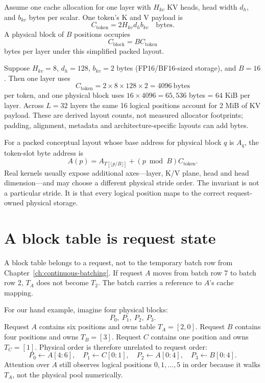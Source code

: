 Assume one cache allocation for one layer with
$H_{kv}$ KV heads, head width $d_h$, and $b_{kv}$ bytes per scalar. One token's
K and V payload is
\begin{equation}
C_{\mathrm{token}}
 = 2H_{kv}d_hb_{kv}\quad\text{bytes}.
\label{eq:paged-token-bytes}
\end{equation}
A physical block of $B$ positions occupies
\begin{equation}
C_{\mathrm{block}}
 = B C_{\mathrm{token}}
\label{eq:paged-block-bytes}
\end{equation}
bytes per layer under this simplified packed layout.

Suppose $H_{kv}=8$, $d_h=128$, $b_{kv}=2$ bytes (FP16/BF16-sized storage), and
$B=16$. Then one layer uses
\[
C_{\mathrm{token}}=2\times8\times128\times2=4096\ \mathrm{bytes}
\]
per token, and one physical block uses
$16\times4096=65{,}536$ bytes = 64 KiB per layer. Across $L=32$ layers the
same 16 logical positions account for 2 MiB of KV payload. These are derived
layout counts, not measured allocator footprints; padding, alignment, metadata
and architecture-specific layouts can add bytes.

For a packed conceptual layout whose base address for physical block $q$ is
$A_q$, the token-slot byte address is
\begin{equation}
A(p)=A_{T[\lfloor p/B\rfloor]}
 +(p\bmod B)C_{\mathrm{token}}.
\label{eq:paged-address}
\end{equation}
Real kernels usually expose additional axes---layer, K/V plane, head and
head dimension---and may choose a different physical stride order. The
invariant is not a particular stride. It is that every logical position maps
to the correct request-owned physical storage.

\section{A block table is request state}

A block table belongs to a request, not to the temporary batch row from
Chapter~\ref{ch:continuous-batching}. If request $A$ moves from batch row 7 to
batch row 2, $T_A$ does not become $T_2$. The batch carries a reference to
$A$'s cache mapping.

For our hand example, imagine four physical blocks:
\[
P_0,\ P_1,\ P_2,\ P_3.
\]
Request $A$ contains six positions and owns table $T_A=[2,0]$.
Request $B$ contains four positions and owns $T_B=[3]$.
Request $C$ contains one position and owns $T_C=[1]$.
Physical order is therefore unrelated to request order:
\[
  P_0\leftarrow A[4{:}6],\quad
  P_1\leftarrow C[0{:}1],\quad
  P_2\leftarrow A[0{:}4],\quad
  P_3\leftarrow B[0{:}4].
\]
Attention over $A$ still observes logical positions $0,1,\ldots,5$ in order
because it walks $T_A$, not the physical pool numerically.

